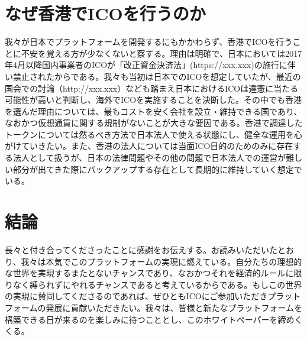 \documentclass{jsarticle}
\begin{document}
\section{なぜ香港でICOを行うのか}
我々が日本でプラットフォームを開発するにもかかわらず、香港でICOを行うことに不安を覚える方が少なくないと察する。理由は明確で、日本においては2017年4月以降国内事業者のICOが「改正資金決済法」(https://xxx.xxx)の施行に伴い禁止されたからである。我々も当初は日本でのICOを想定していたが、最近の国会での討論（http://xxx.xxx）なども踏まえ日本におけるICOは違憲に当たる可能性が高いと判断し、海外でICOを実施することを決断した。その中でも香港を選んだ理由については、最もコストを安く会社を設立・維持できる国であり、なおかつ仮想通貨に関する規制がないことが大きな要因である。香港で調達したトークンについては然るべき方法で日本法人で使える状態にし、健全な運用を心がけていきたい。また、香港の法人については当面ICO目的のためのみに存在する法人として扱うが、日本の法律問題やその他の問題で日本法人での運営が難しい部分が出てきた際にバックアップする存在として長期的に維持していく想定でいる。
\section{結論}
長々と付き合ってくださったことに感謝をお伝えする。お読みいただいたとおり、我々は本気でこのプラットフォームの実現に燃えている。自分たちの理想的な世界を実現するまたとないチャンスであり、なおかつそれを経済的ルールに限りなく縛られずにやれるチャンスであると考えているからである。もしこの世界の実現に賛同してくださるのであれば、ぜひともICOにご参加いただきプラットフォームの発展に貢献いただきたい。我々は、皆様と新たなプラットフォームを構築できる日が来るのを楽しみに待つこととし、このホワイトペーパーを締めくくる。
\end{document}
